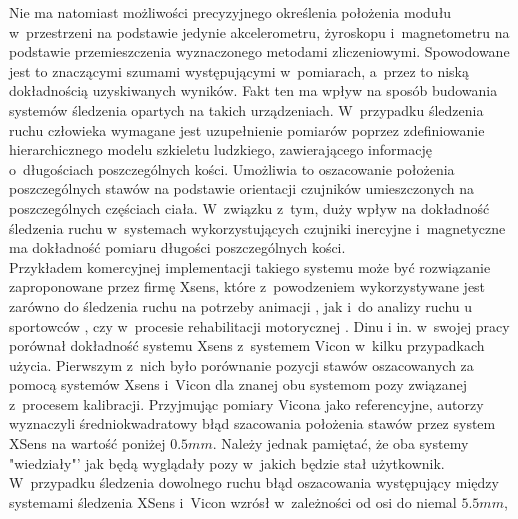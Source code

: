 Nie ma natomiast możliwości precyzyjnego określenia położenia modułu w~przestrzeni na podstawie jedynie akcelerometru, żyroskopu i~magnetometru na podstawie przemieszczenia wyznaczonego metodami zliczeniowymi. Spowodowane jest to znaczącymi szumami występującymi w~pomiarach, a~przez to niską dokładnością uzyskiwanych wyników. Fakt ten ma wpływ na sposób budowania systemów śledzenia opartych na takich urządzeniach. W~przypadku śledzenia ruchu człowieka wymagane jest uzupełnienie pomiarów poprzez zdefiniowanie hierarchicznego modelu szkieletu ludzkiego, zawierającego informację o~długościach poszczególnych kości. Umożliwia to oszacowanie położenia poszczególnych stawów na podstawie orientacji czujników umieszczonych na poszczególnych częściach ciała. W~związku z~tym, duży wpływ na dokładność śledzenia ruchu w~systemach wykorzystujących czujniki inercyjne i~magnetyczne ma dokładność pomiaru długości poszczególnych kości.\\
Przykładem komercyjnej implementacji takiego systemu może być rozwiązanie zaproponowane przez firmę Xsens, które z~powodzeniem wykorzystywane jest zarówno do śledzenia ruchu na potrzeby animacji \cite{XsensEnt}, jak i~do analizy ruchu u sportowców \cite{XsensSport1,XsensSport2}, czy w~procesie rehabilitacji motorycznej \cite{XsensRehab}. Dinu i in. w~swojej pracy \cite{Dinu2016} porównał dokładność systemu Xsens z~systemem Vicon w~kilku przypadkach użycia. Pierwszym z~nich było porównanie pozycji stawów oszacowanych za pomocą systemów Xsens i~Vicon dla znanej obu systemom pozy związanej z~procesem kalibracji. Przyjmując pomiary Vicona jako referencyjne, autorzy wyznaczyli średniokwadratowy błąd szacowania położenia stawów przez system XSens na wartość poniżej $0.5mm$. Należy jednak pamiętać, że oba systemy "wiedziały"' jak będą wyglądały pozy w~jakich będzie stał użytkownik. W~przypadku śledzenia dowolnego ruchu błąd oszacowania występujący między systemami śledzenia XSens i~Vicon wzrósł w~zależności od osi do niemal $5.5mm$,


